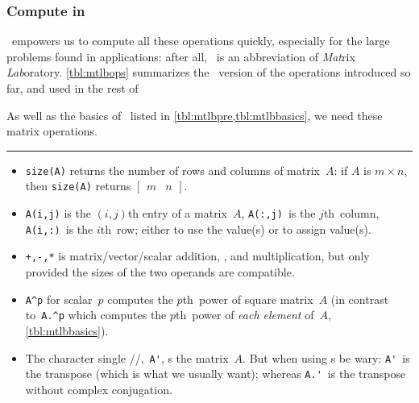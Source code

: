 





\subsubsection{Compute in \script}

\script\ empowers us to compute all these operations quickly, especially for the large problems found in applications: after all, \script[1]\ is an abbreviation of \emph{Mat}rix \emph{Lab}oratory.
\cref{tbl:mtlbops} summarizes the \script\ version of the operations introduced so far, and used in the rest of 

\begin{table}
\caption{As well as the basics of \script\ listed in \cref{tbl:mtlbpre,tbl:mtlbbasics},  we need these matrix operations.} \label{tbl:mtlbops}
\smallskip\hrule\smallskip
\begin{minipage}{\linewidth}
\begin{itemize}
\item {}\verb|size(A)| returns the number of rows and columns of matrix~\(A\): if \(A\) is \(m\times n\), then \verb|size(A)| returns \(\begin{bmatrix} m&n \end{bmatrix}\).
\item \verb|A(i,j)| is the \((i,j)\)th entry of a matrix~\(A\), \verb|A(:,j)|~is the \(j\)th~column, \verb|A(i,:)|~is the \(i\)th~row; either to use the value(s) or to assign value(s).
\item {}\verb|+,-,*| is matrix\slash vector\slash scalar addition, , and multiplication, but only provided the sizes of the two operands are compatible.
\item \verb|A^p| for scalar~\(p\) computes the \(p\)th~power of square matrix~\(A\) (in contrast to~\verb|A.^p| which  computes the \(p\)th~power of \emph{each element} of~\(A\), \cref{tbl:mtlbbasics}).
\item The character single \slash{}\slash{},~\verb|A'|, s the matrix~\(A\).  
But when using s be wary: \verb|A'|~is the  transpose (which is what we usually want); whereas \verb|A.'|~is the transpose without complex conjugation.

\end{itemize}
\end{minipage}
\end{table}
